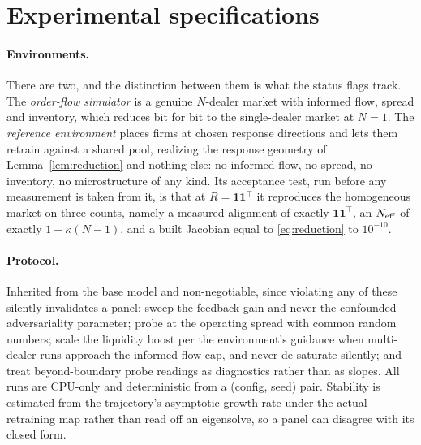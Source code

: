 \section{Experimental specifications}
\label{app:experiments}

\paragraph{Environments.} There are two, and the distinction between them is what the status flags track. The \emph{order-flow simulator} is a genuine $N$-dealer market with informed flow, spread and inventory, which reduces bit for bit to the single-dealer market at $N=1$. The \emph{reference environment} places firms at chosen response directions and lets them retrain against a shared pool, realizing the response geometry of Lemma~\ref{lem:reduction} and nothing else: no informed flow, no spread, no inventory, no microstructure of any kind. Its acceptance test, run before any measurement is taken from it, is that at $R = \mathbf{1}\mathbf{1}^{\top}$ it reproduces the homogeneous market on three counts, namely a measured alignment of exactly $\mathbf{1}\mathbf{1}^{\top}$, an $N_{\mathrm{eff}}$ of exactly $1+\kappa(N-1)$, and a built Jacobian equal to \eqref{eq:reduction} to $10^{-10}$.

\paragraph{Protocol.} Inherited from the base model and non-negotiable, since violating any of these silently invalidates a panel: sweep the feedback gain and never the confounded adversariality parameter; probe at the operating spread with common random numbers; scale the liquidity boost per the environment's guidance when multi-dealer runs approach the informed-flow cap, and never de-saturate silently; and treat beyond-boundary probe readings as diagnostics rather than as slopes. All runs are CPU-only and deterministic from a (config, seed) pair. Stability is estimated from the trajectory's asymptotic growth rate under the actual retraining map rather than read off an eigensolve, so a panel can disagree with its closed form.

